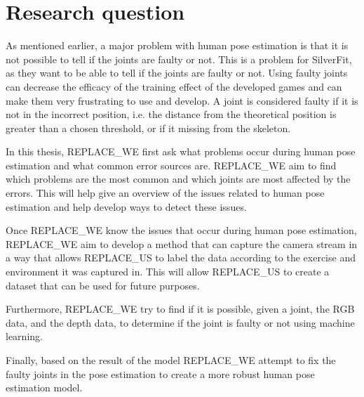 \section{Research question}

As mentioned earlier, a major problem with human pose estimation is that it is not possible to tell if the joints are faulty or not. This is a problem for SilverFit, as they want to be able to tell if the joints are faulty or not. Using faulty joints can decrease the efficacy of the training effect of the developed games and can make them very frustrating to use and develop. A joint is considered faulty if it is not in the incorrect position, i.e. the distance from the theoretical position is greater than a chosen threshold, or if it missing from the skeleton.

In this thesis, REPLACE_WE first ask what problems occur during human pose estimation and what common error sources are. REPLACE_WE aim to find which problems are the most common and which joints are most affected by the errors. This will help give an overview of the issues related to human pose estimation and help develop ways to detect these issues. 

Once REPLACE_WE know the issues that occur during human pose estimation, REPLACE_WE aim to develop a method that can capture the camera stream in a way that allows REPLACE_US to label the data according to the exercise and environment it was captured in. This will allow REPLACE_US to create a dataset that can be used for future purposes.

Furthermore, REPLACE_WE try to find if it is possible, given a joint, the RGB data, and the depth data, to determine if the joint is faulty or not using machine learning. 

Finally, based on the result of the model REPLACE_WE attempt to fix the faulty joints in the pose estimation to create a more robust human pose estimation model.
